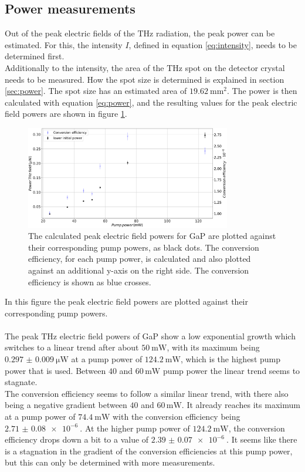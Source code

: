 \subsection{Power measurements}
Out of the peak electric fields of the $\si{\tera\hertz}$ radiation, the peak power can be estimated.
For this, the intensity $I$, defined in equation \ref{eq:intensity}, needs to be determined first.
\\
Additionally to the intensity, the area of the $\si{\tera\hertz}$ spot on the detector crystal needs to be measured.
How the spot size is determined is explained in section \ref{sec:power}.
The spot size has an estimated area of $\SI{19.62}{\milli\meter\squared}$.
The power is then calculated with equation \eqref{eq:power}, and the resulting values for the peak electric field powers are shown in figure \ref{fig:gap_power}.
\begin{figure}
    \centering
    \includegraphics[width=0.8\textwidth]{Plots/Powergap.pdf}
    \caption{The calculated peak electric field powers for GaP are plotted against their corresponding pump powers, as black dots.
    The conversion efficiency, for each pump power, is calculated and also plotted against an additional y-axis on the right side.
    The conversion efficiency is shown as blue crosses.}
    \label{fig:gap_power}
\end{figure}
In this figure the peak electric field powers are plotted against their corresponding pump powers.
\\\\
The peak $\si{\tera\hertz}$ electric field powers of GaP show a low exponential growth which switches to a linear trend after about $\SI{50}{\milli\W}$, with its maximum being $\SI{0.297(9)}{\micro\W}$ at a pump power of $\SI{124.2}{\milli\W}$, which is the highest pump power that is used.
Between $40$ and $60 \, \si{\milli\W}$ pump power the linear trend seems to stagnate.
\\
The conversion efficiency seems to follow a similar linear trend, with there also being a negative gradient between  $40$ and $60 \, \si{\milli\W}$.
It already reaches its maximum at a pump power of $\SI{74.4}{\milli\W}$ with the conversion efficiency being $\SI{2.71(8)e-6}{}$.
At the higher pump power of $\SI{124.2}{\milli\W}$, the conversion efficiency drops down a bit to a value of $\SI{2.39(7)e-6}{}$.
It seems like there is a stagnation in the gradient of the conversion efficiencies at this pump power, but this can only be determined with more measurements.
\FloatBarrier
